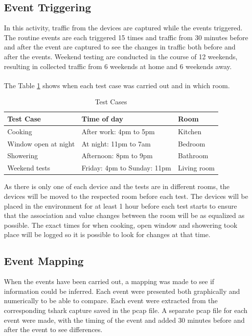 \subsection{Event Triggering}
In this activity, traffic from the devices are captured while the events triggered. The routine events are each triggered 15 times and traffic from 30 minutes before and after the event are captured to see the changes in traffic both before and after the events. Weekend testing are conducted in the course of 12 weekends, resulting in collected traffic from 6 weekends at home and 6 weekends away. 
\\\\
The Table \ref{tab:TestCases} shows when each test case was carried out and in which room. 
\begin{table}[H]
    \centering
    \caption{Test Cases}
    \begin{adjustbox}{width=1\textwidth}
    \begin{tabular}{| p{5cm} | p{5cm} | p{3cm} |} 
        \hline
        \textbf{Test Case} & \textbf{Time of day} & \textbf{Room} \\
        \hline
        Cooking & After work: 4pm to 5pm & Kitchen \\
        \hline
        Window open at night & At night: 11pm to 7am & Bedroom\\
        \hline
        Showering & Afternoon: 8pm to 9pm & Bathroom \\
        \hline
        Weekend tests & Friday: 4pm to Sunday: 11pm & Living room \\
        \hline
    \end{tabular}
    \end{adjustbox}
    \label{tab:TestCases}
\end{table}

As there is only one of each device and the tests are in different rooms, the devices will be moved to the respected room before each test. The devices will be placed in the environment for at least 1 hour before each test starts to ensure that the association and value changes between the room will be as equalized as possible. The exact times for when cooking, open window and showering took place will be logged so it is possible to look for changes at that time. 

\subsection{Event Mapping}
When the events have been carried out, a mapping was made to see if information could be inferred. Each event were presented both graphically and numerically to be able to compare. Each event were extracted from the corresponding tshark capture saved in the pcap file. A separate pcap file for each event were made, with the timing of the event and added 30 minutes before and after the event to see differences. 

